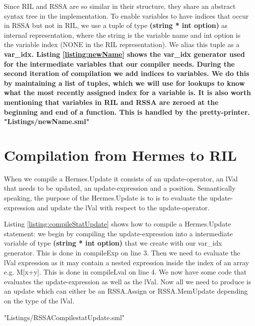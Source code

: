 Since RIL and RSSA are so similar in their structure, they share an abstract syntax tree in the implementation.
To enable variables to have indices that occur in RSSA but not in RIL, we use a tuple of type \textbf{(string * int option)} as internal representation, where the string is the variable name and int option is the variable index (NONE in the RIL representation).
We alias this tuple as a \bf{var\_idx}. Listing \ref{listing:newName} shows the \bf{var\_idx} generator used for the intermediate variables that our compiler needs.
During the second iteration of compilation we add indices to variables. We do this by maintaining a list of tuples, which we will use for lookups to know what the most recently assigned index for a variable is.
It is also worth mentioning that variables in RIL and RSSA are zeroed at the beginning and end of a function. This is handled by the pretty-printer.
 {"Listings/newName.sml"}

\section{Compilation from Hermes to RIL}
When we compile a Hermes.Update it consists of an update-operator, an lVal that needs to be updated, an update-expression and a position. Semantically speaking, the purpose of the Hermes.Update is to is to evaluate the update-expression and update the lVal with respect to the update-operator.

Listing \ref{listing:compileStatUpdate} shows how to compile a Hermes.Update statement: we begin by compiling the update-expression into a intermediate variable of type \textbf{(string * int option)} that we create with our var\_idx generator. This is done in compileExp on line 3. Then we need to evaluate the lVal expression as it may contain a nested expression inside the index of an array e.g. M[x+y]. This is done in compileLval on line 4.
We now have some code that evaluates the update-expression as well as the lVal. Now all we need to produce is an update which can either be an RSSA.Assign or RSSA.MemUpdate depending on the type of the lVal.

 {"Listings/RSSACompilestatUpdate.sml"}


